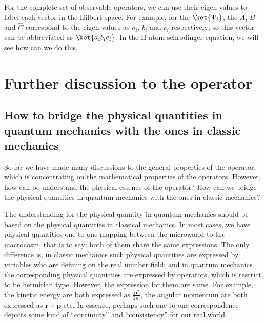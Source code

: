 For the complete set of observable operators, we can use their eigen
values to label each vector in the Hilbert space. For example, for
the $\ket{\Psi_{i}}$, the $\hat{A}$, $\hat{B}$ and $\hat{C}$
correspond to the eigen values as $a_{i}$, $b_{i}$ and $c_{i}$
respectively; so this vector can be abbreviated as
$\ket{a_{i}b_{i}c_{i}}$. In the H atom schrodinger equation, we will
see how can we do this.


\section{Further discussion to the operator}
\label{further_in_operator}

\subsection{How to bridge the physical quantities in quantum mechanics
with the ones in classic mechanics}
\label{vector_schalar_in_operator}
%
%
So far we have made many discussions to the general properties of
the operator, which is concentrating on the mathematical properties
of the operators. However, how can be understand the physical
essence of the operator? How can we bridge the physical quantities
in quantum mechanics with the ones in classic mechanics?

The understanding for the physical quantity in quantum mechanics
should be based on the physical quantities in classical mechanics.
In most cases, we have physical quantities one to one mapping
between the microworld to the macrocosm, that is to say; both of
them share the same expressions. The only difference is, in classic
mechanics such physical quantities are expressed by variables who
are defining on the real number field; and in quantum mechanics the
corresponding physical quantities are expressed by operators, which
is restrict to be hermitian type. However, the expression for them
are same. For example, the kinetic energy are both expressed as
$\frac{\bm{p}^{2}}{2m}$, the angular momentum are both expressed as
$\bm{r}\times\bm{p}$ etc. In essence, perhaps such one to one
correspondence depicts some kind of ``continuity'' and
``consistency'' for our real world.

